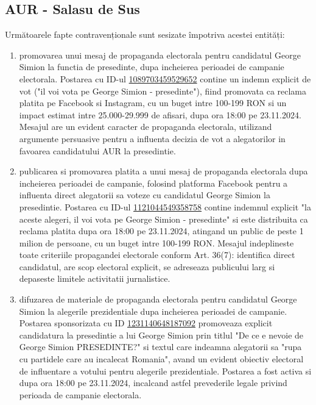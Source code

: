 \documentclass[a4paper,12pt]{article}
\begin{document}
\vspace{0.5cm}

\subsection{AUR - Salasu de Sus}
Următoarele fapte contravenționale sunt sesizate împotriva acestei entități:

\begin{enumerate}[leftmargin=*, label=\arabic*.)]
    \item promovarea unui mesaj de propaganda electorala pentru candidatul George Simion la functia de presedinte, dupa incheierea perioadei de campanie electorala. Postarea cu ID-ul \href{https://www.facebook.com/ads/library/?id=1089703459529652}{1089703459529652} contine un indemn explicit de vot ("il voi vota pe George Simion - presedinte"), fiind promovata ca reclama platita pe Facebook si Instagram, cu un buget intre 100-199 RON si un impact estimat intre 25.000-29.999 de afisari, dupa ora 18:00 pe 23.11.2024. Mesajul are un evident caracter de propaganda electorala, utilizand argumente persuasive pentru a influenta decizia de vot a alegatorilor in favoarea candidatului AUR la presedintie.
    \item publicarea si promovarea platita a unui mesaj de propaganda electorala dupa incheierea perioadei de campanie, folosind platforma Facebook pentru a influenta direct alegatorii sa voteze cu candidatul George Simion la presedintie. Postarea cu ID-ul \href{https://www.facebook.com/ads/library/?id=1121044549358758}{1121044549358758} contine indemnul explicit "la aceste alegeri, il voi vota pe George Simion - presedinte" si este distribuita ca reclama platita dupa ora 18:00 pe 23.11.2024, atingand un public de peste 1 milion de persoane, cu un buget intre 100-199 RON. Mesajul indeplineste toate criteriile propagandei electorale conform Art. 36(7): identifica direct candidatul, are scop electoral explicit, se adreseaza publicului larg si depaseste limitele activitatii jurnalistice.
    \item difuzarea de materiale de propaganda electorala pentru candidatul George Simion la alegerile prezidentiale dupa incheierea perioadei de campanie. Postarea sponsorizata cu ID \href{https://www.facebook.com/ads/library/?id=1231140648187092}{1231140648187092} promoveaza explicit candidatura la presedintie a lui George Simion prin titlul "De ce e nevoie de George Simion PRESEDINTE?" si textul care indeamna alegatorii sa "rupa cu partidele care au incalecat Romania", avand un evident obiectiv electoral de influentare a votului pentru alegerile prezidentiale. Postarea a fost activa si dupa ora 18:00 pe 23.11.2024, incalcand astfel prevederile legale privind perioada de campanie electorala.

\end{enumerate}
\end{document}
